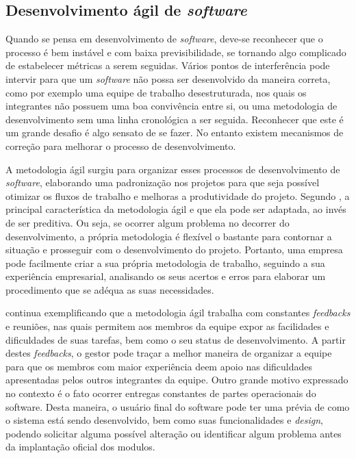 \subsection{{Desenvolvimento ágil de \textit{software}}}

Quando se pensa em desenvolvimento de \textit{software}, deve-se reconhecer que o processo é bem instável e com baixa previsibilidade, se tornando algo complicado de estabelecer métricas a serem seguidas. Vários pontos de interferência pode intervir para que um \textit{software} não possa ser desenvolvido da maneira correta, como por exemplo uma equipe de trabalho desestruturada, nos quais os integrantes não possuem uma boa convivência entre si, ou uma metodologia de desenvolvimento sem uma linha cronológica a ser seguida. Reconhecer que este é um grande desafio é algo sensato de se fazer. No entanto existem mecanismos de correção para melhorar o processo de desenvolvimento.

A metodologia ágil surgiu para organizar esses processos de desenvolvimento de \textit{software}, elaborando uma padronização nos projetos para que seja possível otimizar os fluxos de trabalho e melhoras a produtividade do projeto. Segundo , a principal característica da metodologia ágil e que ela pode ser adaptada, ao invés de ser preditiva. Ou seja, se ocorrer algum problema no decorrer do desenvolvimento, a própria metodologia é flexível o bastante para contornar a situação e prosseguir com o desenvolvimento do projeto. Portanto, uma empresa pode facilmente criar a sua própria metodologia de trabalho, seguindo a sua experiência empresarial, analisando os seus acertos e erros para elaborar um procedimento que se adéqua as suas necessidades. 

 continua exemplificando que a metodologia ágil trabalha com constantes \textit{feedbacks} e reuniões, nas quais permitem aos membros da equipe expor as facilidades e dificuldades de suas tarefas, bem como o seu status de desenvolvimento. A partir destes \textit{feedbacks}, o gestor pode traçar a melhor maneira de organizar a equipe para que os membros com maior experiência deem apoio nas dificuldades apresentadas pelos outros integrantes da equipe. Outro grande motivo expressado no contexto é o fato ocorrer entregas constantes de partes operacionais do software. Desta maneira, o usuário final do software pode ter uma prévia de como o sistema está sendo desenvolvido, bem como suas funcionalidades e \textit{design}, podendo solicitar alguma possível alteração ou identificar algum problema antes da implantação oficial dos modulos.



